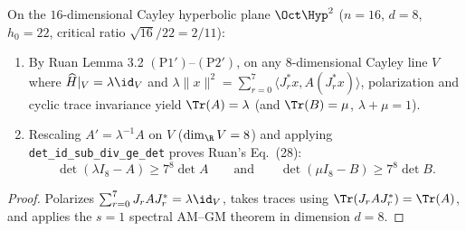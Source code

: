 \begin{theorem}
\label{thm_cayley_block_bounds}
\leanok
{}
On the $16$-dimensional Cayley hyperbolic plane $\Oct\Hyp^2$ ($n = 16$, $d = 8$, $h_0 = 22$, critical ratio $\sqrt{16}/22 = 2/11$):
\begin{enumerate}
\item By Ruan Lemma 3.2 $\mathrm{(P1')}$--$\mathrm{(P2')}$, on any $8$-dimensional Cayley line $V$ where $\widehat{H}|_V = \lambda \id_V$ and $\lambda \|x\|^2 = \sum_{r=0}^7 \langle J_r^* x, A(J_r^* x)\rangle$, polarization and cyclic trace invariance yield $\Tr(A) = \lambda$ (and $\Tr(B) = \mu$, $\lambda + \mu = 1$).
\item Rescaling $A' = \lambda^{-1} A$ on $V$ ($\dim_\R V = 8$) and applying \texttt{det\_id\_sub\_div\_ge\_det} proves Ruan's Eq.~(28):
$$\det(\lambda I_8 - A) \ge 7^8 \det A \qquad\text{and}\qquad \det(\mu I_8 - B) \ge 7^8 \det B.$$
\end{enumerate}
\end{theorem}
\begin{proof}\leanok Polarizes $\sum_{r=0}^7 J_r A J_r^* = \lambda \id_V$, takes traces using $\Tr(J_r A J_r^*) = \Tr(A)$, and applies the $s = 1$ spectral AM--GM theorem in dimension $d = 8$.\end{proof}

